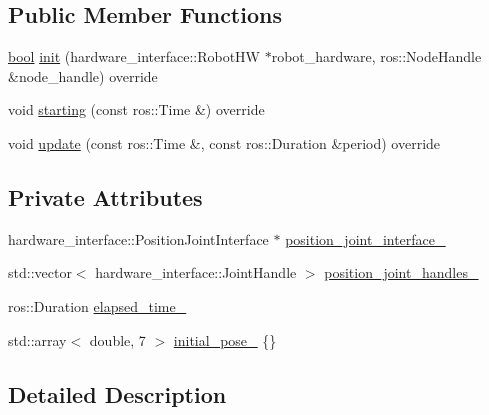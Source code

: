 \subsection*{Public Member Functions}
\begin{DoxyCompactItemize}
\item 
\hyperlink{classbool}{bool} \hyperlink{classfranka__example__controllers_1_1JointPositionExampleController_a958b27b475476717543b8cc107bd6c1b}{init} (hardware\+\_\+interface\+::\+Robot\+HW $\ast$robot\+\_\+hardware, ros\+::\+Node\+Handle \&node\+\_\+handle) override
\item 
void \hyperlink{classfranka__example__controllers_1_1JointPositionExampleController_a2b8711e7421963f686c7383d624e38a8}{starting} (const ros\+::\+Time \&) override
\item 
void \hyperlink{classfranka__example__controllers_1_1JointPositionExampleController_a3475db8f06dde9e37fd03660ef4d1cb0}{update} (const ros\+::\+Time \&, const ros\+::\+Duration \&period) override
\end{DoxyCompactItemize}
\subsection*{Private Attributes}
\begin{DoxyCompactItemize}
\item 
hardware\+\_\+interface\+::\+Position\+Joint\+Interface $\ast$ \hyperlink{classfranka__example__controllers_1_1JointPositionExampleController_a04b7891338d07eeb78febf6085190f83}{position\+\_\+joint\+\_\+interface\+\_\+}
\item 
std\+::vector$<$ hardware\+\_\+interface\+::\+Joint\+Handle $>$ \hyperlink{classfranka__example__controllers_1_1JointPositionExampleController_acaa5902db27586e01e48939526e27e5a}{position\+\_\+joint\+\_\+handles\+\_\+}
\item 
ros\+::\+Duration \hyperlink{classfranka__example__controllers_1_1JointPositionExampleController_acdbb7dc1611653a0c6bed1d94dc0c979}{elapsed\+\_\+time\+\_\+}
\item 
std\+::array$<$ double, 7 $>$ \hyperlink{classfranka__example__controllers_1_1JointPositionExampleController_aec370794d28554126ba021f10c8216ce}{initial\+\_\+pose\+\_\+} \{\}
\end{DoxyCompactItemize}


\subsection{Detailed Description}



